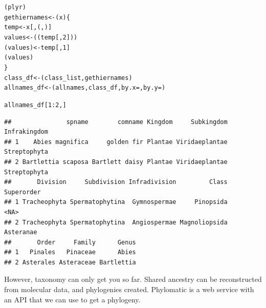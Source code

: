 \begin{knitrout}
\begin{kframe}
\begin{alltt}
(plyr)
gethiernames <- (x) \{
    temp <- x[, (, )]
    values <- ((temp[, 2]))
    (values) <- temp[, 1]
    (values)
\}
class_df <- (class_list, gethiernames)
allnames_df <- (allnames, class_df, by.x = , by.y = )

allnames_df[1:2, ]
\end{alltt}
\begin{verbatim}
##               spname        comname Kingdom     Subkingdom Infrakingdom
## 1    Abies magnifica     golden fir Plantae Viridaeplantae Streptophyta
## 2 Bartlettia scaposa Bartlett daisy Plantae Viridaeplantae Streptophyta
##       Division     Subdivision Infradivision         Class Superorder
## 1 Tracheophyta Spermatophytina  Gymnospermae     Pinopsida       <NA>
## 2 Tracheophyta Spermatophytina  Angiospermae Magnoliopsida  Asteranae
##       Order     Family      Genus
## 1   Pinales   Pinaceae      Abies
## 2 Asterales Asteraceae Bartlettia
\end{verbatim}
\begin{alltt}

\end{alltt}
\end{kframe}
\end{knitrout}


However, taxonomy can only get you so far. Shared ancestry can be reconstructed from molecular data, and phylogenies created. Phylomatic is a web service with an API that we can use to get a phylogeny. 

